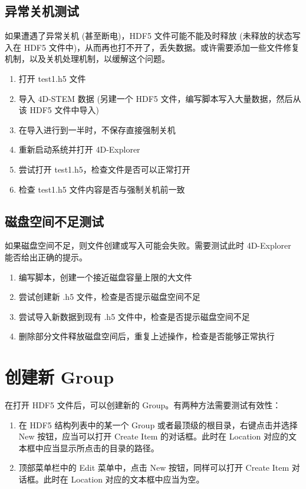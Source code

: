 \documentclass[a4paper,12pt]{report}	%
\begin{document}
\subsection{异常关机测试}
如果遭遇了异常关机 (甚至断电)，HDF5 文件可能不能及时释放 (未释放的状态写入在 HDF5 文件中)，从而再也打不开了，丢失数据。或许需要添加一些文件修复机制，以及关机处理机制，以缓解这个问题。
\begin{enumerate}
    \item 打开 test1.h5 文件
    \item 导入 4D-STEM 数据 (另建一个 HDF5 文件，编写脚本写入大量数据，然后从该 HDF5 文件中导入)
    \item 在导入进行到一半时，不保存直接强制关机
    \item 重新启动系统并打开 4D-Explorer
    \item 尝试打开 test1.h5，检查文件是否可以正常打开
    \item 检查 test1.h5 文件内容是否与强制关机前一致
\end{enumerate}

\subsection{磁盘空间不足测试}
如果磁盘空间不足，则文件创建或写入可能会失败。需要测试此时 4D-Explorer 能否给出正确的提示。
\begin{enumerate}
    \item 编写脚本，创建一个接近磁盘容量上限的大文件
    \item 尝试创建新 .h5 文件，检查是否提示磁盘空间不足
    \item 尝试导入新数据到现有 .h5 文件中，检查是否提示磁盘空间不足
    \item 删除部分文件释放磁盘空间后，重复上述操作，检查是否能够正常执行
\end{enumerate}


\section{创建新 Group}

在打开 HDF5 文件后，可以创建新的 Group。有两种方法需要测试有效性：
\begin{enumerate}
\item 在 HDF5 结构列表中的某一个 Group 或者最顶级的根目录，右键点击并选择 New 按钮，应当可以打开 Create Item 的对话框。此时在 Location 对应的文本框中应当显示所点击的目录的路径。
\item 顶部菜单栏中的 Edit 菜单中，点击 New 按钮，同样可以打开 Create Item 对话框。此时在 Location 对应的文本框中应当为空。
\end{enumerate}
\end{document}
